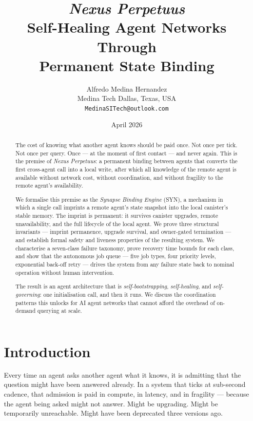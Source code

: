\documentclass[12pt]{article}
\title{\textbf{\textit{Nexus Perpetuus} \\
  \normalfont\large Self-Healing Agent Networks Through \\
  Permanent State Binding}}
\author{Alfredo Medina Hernandez \\
  \normalsize Medina Tech \quad Dallas, Texas, USA \\
  \normalsize \texttt{MedinaSITech@outlook.com}}
\date{April 2026}
\begin{document}
\maketitle

\begin{abstract}
The cost of knowing what another agent knows should be paid once.  Not once
per tick.  Not once per query.  Once — at the moment of first contact — and
never again.  This is the premise of \emph{Nexus Perpetuus}: a permanent
binding between agents that converts the first cross-agent call into a local
write, after which all knowledge of the remote agent is available without
network cost, without coordination, and without fragility to the remote
agent's availability.

We formalise this premise as the \emph{Synapse Binding Engine} (SYN), a
mechanism in which a single call imprints a remote agent's state snapshot
into the local canister's stable memory.  The imprint is permanent: it
survives canister upgrades, remote unavailability, and the full lifecycle of
the local agent.  We prove three structural invariants — imprint permanence,
upgrade survival, and owner-gated termination — and establish formal safety
and liveness properties of the resulting system.  We characterise a seven-class
failure taxonomy, prove recovery time bounds for each class, and show that the
autonomous job queue — five job types, four priority levels, exponential
back-off retry — drives the system from any failure state back to nominal
operation without human intervention.

The result is an agent architecture that is \emph{self-bootstrapping},
\emph{self-healing}, and \emph{self-governing}: one initialisation call, and
then it runs.  We discuss the coordination patterns this unlocks for AI agent
networks that cannot afford the overhead of on-demand querying at scale.
\end{abstract}

\section{Introduction}
\label{sec:intro}

Every time an agent asks another agent what it knows, it is admitting that
the question might have been answered already.  In a system that ticks at
sub-second cadence, that admission is paid in compute, in latency, and in
fragility — because the agent being asked might not answer.  Might be
upgrading.  Might be temporarily unreachable.  Might have been deprecated
three versions ago.
\end{document}
